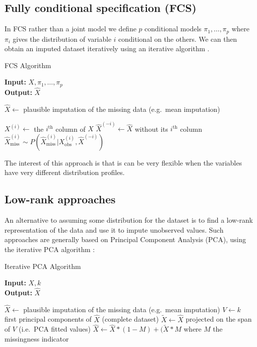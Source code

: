 		\subsection{Fully conditional specification (FCS)}
In FCS rather than a joint model we define $p$ conditional models $\pi_1, \ldots, \pi_p$ where $\pi_i$ gives the distribution of variable $i$ conditional on the others. We can then obtain an imputed dataset iteratively using an iterative algorithm \cite{MICE_founding}.
\begin{algorithm}[H]
	\caption{FCS Algorithm}
	\hspace*{\algorithmicindent} \textbf{Input:} $X, \pi_1, \ldots, \pi_p$\\
 	\hspace*{\algorithmicindent} \textbf{Output:} $\hat{X}$
	\begin{algorithmic}[1]
		\State $\hat{X} \leftarrow $ plausible imputation of the missing data (e.g.\ mean imputation)

				\State $X^{(i)} \leftarrow $ the $i^{\text{th}}$ column of $X$
				\State $\hat{X}^{(-i)} \leftarrow \hat{X}$ without its $i^{\text{th}}$ column
				\State $\hat{X}^{(i)}_{\text{miss}} \sim P(\hat{X}^{(i)}_{\text{miss}} \vert {X}^{(i)}_{\text{obs}}, \hat{X}^{(-i)})$
			\EndFor
		\EndWhile
	\end{algorithmic}
\end{algorithm}

The interest of this approach is that is can be very flexible when the variables have very different distribution profiles. 
		\subsection{Low-rank approaches}
An alternative to assuming some distribution for the dataset is to find a low-rank representation of the data and use it to impute unobserved values. Such approaches \cite{josse2012missPCA}\cite{chen2004missSVD}\cite{brand2002incremental} are generally based on Principal Component Analysis (PCA)\cite{PCA}, using the iterative PCA algorithm \cite{iter_PCA}:		
		\begin{algorithm}[H]
	\caption{Iterative PCA Algorithm}
	\hspace*{\algorithmicindent} \textbf{Input:} $X, k$ \\
 	\hspace*{\algorithmicindent} \textbf{Output:} $\hat{X}$
	\begin{algorithmic}[1]
		\State $\hat{X} \leftarrow $ plausible imputation of the missing data (e.g.\ mean imputation)
			\State $V \leftarrow k$ first principal components of $\hat{X}$ (complete dataset)
			\State $\tilde{X} \leftarrow \hat{X}$ projected on the span of $V$ (i.e.\ PCA fitted values)
			\State $\hat{X} \leftarrow \hat{X} * (1-M) + (\tilde{X} * M$ where $M$ the missingness indicator
		\EndWhile
	\end{algorithmic}
\end{algorithm}		

